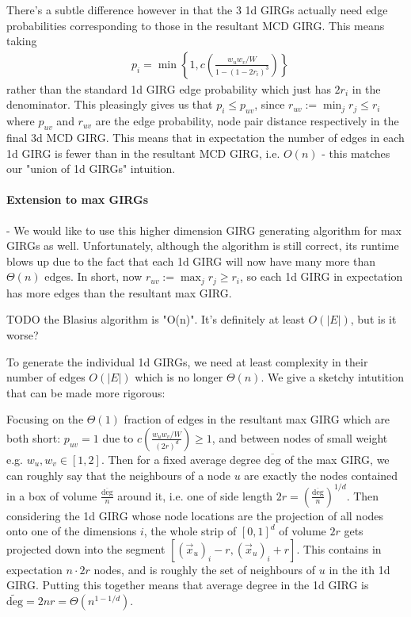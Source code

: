 There's a subtle difference however in that the $3$ 1d GIRGs actually need edge probabilities corresponding to those in the resultant MCD GIRG. This means taking
\begin{align*}
    & p_i = \min \left \{
        1, c \left ( 
            \frac{w_u w_v / W}{1 - (1 - 2 r_i)^3}
        \right )     
    \right \}
\end{align*}
rather than the standard 1d GIRG edge probability which just has $2 r_i$ in the denominator. This pleasingly gives us that $p_i \leq p_{uv}$, since $r_{uv} := \min_j r_j \leq r_i$ where $p_{uv}$ and $r_{uv}$ are the edge probability, node pair distance respectively in the final 3d MCD GIRG. This means that in expectation the number of edges in each 1d GIRG is fewer than in the resultant MCD GIRG, i.e. $O(n)$ - this matches our "union of 1d GIRGs" intuition.

\paragraph{Extension to max GIRGs} - We would like to use this higher dimension GIRG generating algorithm for max GIRGs as well. Unfortunately, although the algorithm is still correct, its runtime blows up due to the fact that each 1d GIRG will now have many more than $\Theta(n)$ edges. In short, now $r_{uv} := \max_j r_j \geq r_i$, so each 1d GIRG in expectation has more edges than the resultant max GIRG. 

TODO the Blasius algorithm is "O(n)". It's definitely at least $O(|E|)$, but is it worse?

To generate the individual 1d GIRGs, we need at least complexity in their number of edges $O(|E|)$ which is no longer $\Theta(n)$. We give a sketchy intutition that can be made more rigorous:

Focusing on the $\Theta(1)$ fraction of edges in the resultant max GIRG which are both short: $p_{uv} = 1$ due to $c \left ( \frac{w_u w_v / W}{(2r)^d} \right ) \geq 1$, and between nodes of small weight e.g. $w_u, w_v \in [1, 2]$. Then for a fixed average degree $\overline{\text{deg}}$ of the max GIRG, we can roughly say that the neighbours of a node $u$ are exactly the nodes contained in a box of volume $\frac{\overline{\text{deg}}}{n}$ around it, i.e. one of side length $2r  = \left ( \frac{\overline{\text{deg}}}{ n} \right )^{1/d}$.
Then considering the 1d GIRG whose node locations are the projection of all nodes onto one of the dimensions $i$, the whole strip of $[0, 1]^d$ of volume $2r$ gets projected down into the segment $[(\vec{x}_u)_i - r, (\vec{x}_u)_i +r]$.
This contains in expectation $n \cdot 2r$ nodes, and is roughly the set of neighbours of $u$ in the ith 1d GIRG. Putting this together means that average degree in the 1d GIRG is $\widetilde{\text{deg}} = 2nr = \Theta(n^{1 - 1/d})$.

